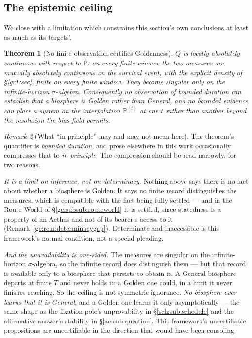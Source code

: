 \documentclass[11pt]{article}
\numberwithin{equation}{section}
\theoremstyle{plain}
\newtheorem{theorem}{Theorem}[section]
\theoremstyle{definition}
\theoremstyle{remark}
\newtheorem{remark}[theorem]{Remark}
\newcommand{\PP}{\mathbb{P}}
\begin{document}
\subsection{The epistemic ceiling}\label{gr:sub:ceiling}

We close with a limitation which constrains this section's own
conclusions at least as much as its targets'.

\begin{theorem}[No finite observation certifies Goldenness]
\label{gr:thm:ceiling}
$Q$ is locally absolutely continuous with respect to $\PP$: on every
finite window the two measures are mutually absolutely continuous on the
survival event, with the explicit density of \S\ref{gr1:sec}, finite on
every finite window. They
become singular only on the infinite-horizon $\sigma$-algebra.
Consequently no observation of bounded duration can establish that a
biosphere is Golden rather than General, and no bounded evidence can
place a system on the interpolation $\PP^{(t)}$ at one $t$ rather than
another beyond the resolution the bias field permits.
\end{theorem}

\begin{remark}[What ``in principle'' may and may not mean here]
\label{gr:rem:ceilingscope}
The theorem's quantifier is \emph{bounded duration}, and prose elsewhere
in this work occasionally compresses that to \emph{in principle}. The
compression should be read narrowly, for two reasons.

\emph{It is a limit on inference, not on determinacy.} Nothing above says
there is no fact about whether a biosphere is Golden. It says no finite
record distinguishes the measures, which is compatible with the fact
being fully settled --- and in the Route World of
\S\ref{gc:subsub:routeworld} it is settled, since statedness is a
property of an Aethus and not of its bearer's access to it
(Remark~\ref{gc:rem:determinacygap}). Determinate and inaccessible is
this framework's normal condition, not a special pleading.

\emph{And the unavailability is one-sided.} The measures are singular on
the infinite-horizon $\sigma$-algebra, so the infinite record does
distinguish them --- but that record is available only to a biosphere
that persists to obtain it. A General biosphere departs at finite $T$ and
never holds it; a Golden one could, in a limit it never finishes
reaching. So the ceiling is not symmetric ignorance. \emph{No biosphere
ever learns that it is General}, and a Golden one learns it only
asymptotically --- the same shape as the fixation pole's unprovability in
\S\ref{sch:sub:schedule} and the affirmative answer's stability in
\S\ref{ac:sub:question}. This framework's uncertifiable propositions are
uncertifiable in the direction that would have been consoling.
\end{remark}
\end{document}
